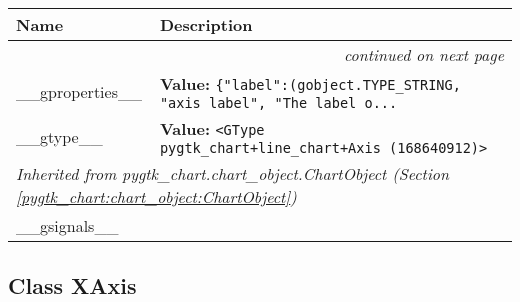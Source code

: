     \vspace{-1cm}
\hspace{\varindent}\begin{longtable}{|p{\varnamewidth}|p{\vardescrwidth}|l}
\cline{1-2}
\cline{1-2} \centering \textbf{Name} & \centering \textbf{Description}& \\
\cline{1-2}
\endhead\cline{1-2}\multicolumn{3}{r}{\small\textit{continued on next page}}\\\endfoot\cline{1-2}
\endlastfoot\raggedright \_\-\_\-g\-p\-r\-o\-p\-e\-r\-t\-i\-e\-s\-\_\-\_\- & \raggedright \textbf{Value:} 
{\tt \{"label":(gobject.TYPE\_STRING, "axis label", "The label o\texttt{...}}&\\
\cline{1-2}
\raggedright \_\-\_\-g\-t\-y\-p\-e\-\_\-\_\- & \raggedright \textbf{Value:} 
{\tt {\textless}GType pygtk\_chart+line\_chart+Axis (168640912){\textgreater}}&\\
\cline{1-2}
\multicolumn{2}{|l|}{\textit{Inherited from pygtk\_chart.chart\_object.ChartObject \textit{(Section \ref{pygtk_chart:chart_object:ChartObject})}}}\\
\multicolumn{2}{|p{\varwidth}|}{\raggedright \_\_gsignals\_\_}\\
\cline{1-2}
\end{longtable}



\subsection{Class XAxis}

